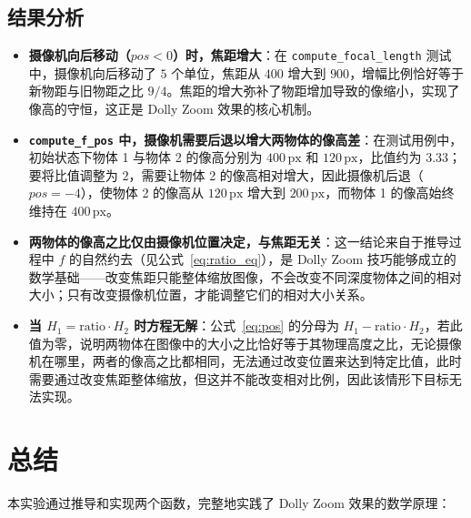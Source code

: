\documentclass[12pt,a4paper]{ctexart}
\begin{document}
\subsection{结果分析}

\begin{itemize}
  \item \textbf{摄像机向后移动（$pos < 0$）时，焦距增大}：在 \texttt{compute\_focal\_length} 测试中，摄像机向后移动了 $5$ 个单位，焦距从 $400$ 增大到 $900$，增幅比例恰好等于新物距与旧物距之比 $9/4$。焦距的增大弥补了物距增加导致的像缩小，实现了像高的守恒，这正是 Dolly Zoom 效果的核心机制。

  \item \textbf{\texttt{compute\_f\_pos} 中，摄像机需要后退以增大两物体的像高差}：在测试用例中，初始状态下物体 1 与物体 2 的像高分别为 $400\,\text{px}$ 和 $120\,\text{px}$，比值约为 $3.33$；要将比值调整为 $2$，需要让物体 2 的像高相对增大，因此摄像机后退（$pos = -4$），使物体 2 的像高从 $120\,\text{px}$ 增大到 $200\,\text{px}$，而物体 1 的像高始终维持在 $400\,\text{px}$。

  \item \textbf{两物体的像高之比仅由摄像机位置决定，与焦距无关}：这一结论来自于推导过程中 $f$ 的自然约去（见公式~\eqref{eq:ratio_eq}），是 Dolly Zoom 技巧能够成立的数学基础——改变焦距只能整体缩放图像，不会改变不同深度物体之间的相对大小；只有改变摄像机位置，才能调整它们的相对大小关系。

  \item \textbf{当 $H_1 = \text{ratio} \cdot H_2$ 时方程无解}：公式~\eqref{eq:pos} 的分母为 $H_1 - \text{ratio} \cdot H_2$，若此值为零，说明两物体在图像中的大小之比恰好等于其物理高度之比，无论摄像机在哪里，两者的像高之比都相同，无法通过改变位置来达到特定比值，此时需要通过改变焦距整体缩放，但这并不能改变相对比例，因此该情形下目标无法实现。
\end{itemize}

\section{总结}

本实验通过推导和实现两个函数，完整地实践了 Dolly Zoom 效果的数学原理：
\end{document}
